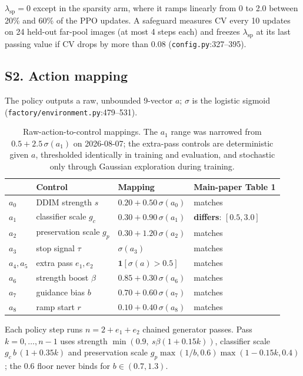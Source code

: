 $\lambda_{\text{sp}} = 0$ except in the sparsity arm, where it ramps linearly from 0 to 2.0 between 20\% and 60\% of the PPO updates. A safeguard measures CV every 10 updates on 24 held-out far-pool images (at most 4 steps each) and freezes $\lambda_{\text{sp}}$ at its last passing value if CV drops by more than 0.08 (\texttt{config.py}:327--395).

\subsection*{S2. Action mapping}

The policy outputs a raw, unbounded 9-vector $a$; $\sigma$ is the logistic sigmoid (\texttt{factory/environment.py}:479--531).

\begin{table}[t]
\centering
\small
\begin{tabular}{@{}llll@{}}
\toprule
& Control & Mapping & Main-paper Table 1 \\
\midrule
$a_0$ & DDIM strength $s$ & $0.20 + 0.50\,\sigma(a_0)$ & matches \\
$a_1$ & classifier scale $g_c$ & $0.30 + 0.90\,\sigma(a_1)$ & \textbf{differs}: $[0.5, 3.0]$ \\
$a_2$ & preservation scale $g_p$ & $0.30 + 1.20\,\sigma(a_2)$ & matches \\
$a_3$ & stop signal $\tau$ & $\sigma(a_3)$ & matches \\
$a_4, a_5$ & extra pass $e_1, e_2$ & $\mathbf{1}[\sigma(a) > 0.5]$ & matches \\
$a_6$ & strength boost $\beta$ & $0.85 + 0.30\,\sigma(a_6)$ & matches \\
$a_7$ & guidance bias $b$ & $0.70 + 0.60\,\sigma(a_7)$ & matches \\
$a_8$ & ramp start $r$ & $0.10 + 0.40\,\sigma(a_8)$ & matches \\
\bottomrule
\end{tabular}
\caption{Raw-action-to-control mappings. The $a_1$ range was narrowed from $0.5 + 2.5\,\sigma(a_1)$ on 2026-08-07; the extra-pass controls are deterministic given $a$, thresholded identically in training and evaluation, and stochastic only through Gaussian exploration during training.}
\end{table}

Each policy step runs $n = 2 + e_1 + e_2$ chained generator passes. Pass $k = 0, \dots, n-1$ uses strength $\min(0.9,\ s\beta(1 + 0.15k))$, classifier scale $g_c\, b\,(1 + 0.35k)$ and preservation scale $g_p \max(1/b, 0.6)\max(1 - 0.15k, 0.4)$; the 0.6 floor never binds for $b \in (0.7, 1.3)$.

